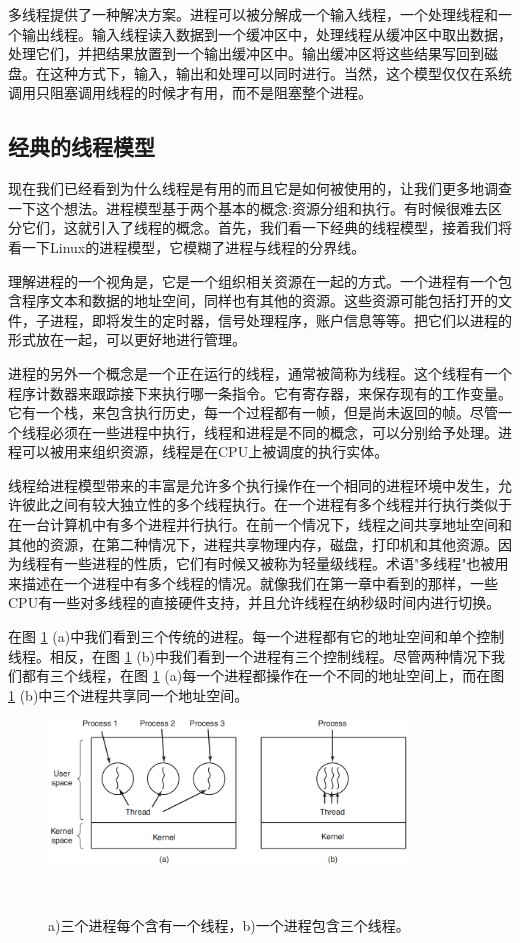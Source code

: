 	多线程提供了一种解决方案。进程可以被分解成一个输入线程，一个处理线程和一个输出线程。输入线程读入数据到一个缓冲区中，处理线程从缓冲区中取出数据，处理它们，并把结果放置到一个输出缓冲区中。输出缓冲区将这些结果写回到磁盘。在这种方式下，输入，输出和处理可以同时进行。当然，这个模型仅仅在系统调用只阻塞调用线程的时候才有用，而不是阻塞整个进程。
	
	\subsection{经典的线程模型}
	
	现在我们已经看到为什么线程是有用的而且它是如何被使用的，让我们更多地调查一下这个想法。进程模型基于两个基本的概念:资源分组和执行。有时候很难去区分它们，这就引入了线程的概念。首先，我们看一下经典的线程模型，接着我们将看一下Linux的进程模型，它模糊了进程与线程的分界线。
	
	理解进程的一个视角是，它是一个组织相关资源在一起的方式。一个进程有一个包含程序文本和数据的地址空间，同样也有其他的资源。这些资源可能包括打开的文件，子进程，即将发生的定时器，信号处理程序，账户信息等等。把它们以进程的形式放在一起，可以更好地进行管理。
	
	进程的另外一个概念是一个正在运行的线程，通常被简称为线程。这个线程有一个程序计数器来跟踪接下来执行哪一条指令。它有寄存器，来保存现有的工作变量。它有一个栈，来包含执行历史，每一个过程都有一帧，但是尚未返回的帧。尽管一个线程必须在一些进程中执行，线程和进程是不同的概念，可以分别给予处理。进程可以被用来组织资源，线程是在CPU上被调度的执行实体。
	
	线程给进程模型带来的丰富是允许多个执行操作在一个相同的进程环境中发生，允许彼此之间有较大独立性的多个线程执行。在一个进程有多个线程并行执行类似于在一台计算机中有多个进程并行执行。在前一个情况下，线程之间共享地址空间和其他的资源，在第二种情况下，进程共享物理内存，磁盘，打印机和其他资源。因为线程有一些进程的性质，它们有时候又被称为轻量级线程。术语"多线程"也被用来描述在一个进程中有多个线程的情况。就像我们在第一章中看到的那样，一些CPU有一些对多线程的直接硬件支持，并且允许线程在纳秒级时间内进行切换。
	
	在图 \ref{fig:processthread} (a)中我们看到三个传统的进程。每一个进程都有它的地址空间和单个控制线程。相反，在图 \ref{fig:processthread} (b)中我们看到一个进程有三个控制线程。尽管两种情况下我们都有三个线程，在图 \ref{fig:processthread} (a)每一个进程都操作在一个不同的地址空间上，而在图 \ref{fig:processthread} (b)中三个进程共享同一个地址空间。
	
	\begin{figure}[ht]\small
		\centering
		\includegraphics[width=0.85\textwidth]{FIG/2-11.png}
		\caption{a)三个进程每个含有一个线程，b)一个进程包含三个线程。}　\label{fig:processthread}
	\end{figure}

